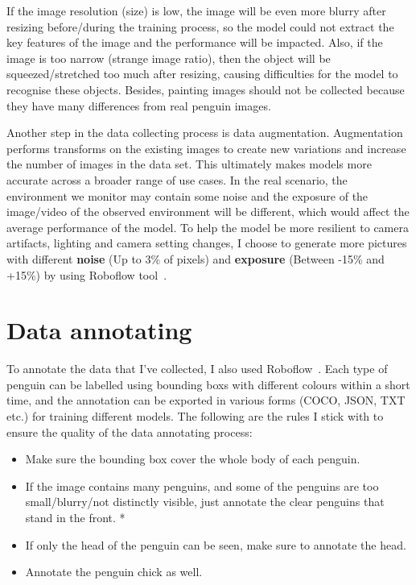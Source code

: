 \documentclass[runningheads]{llncs}
\begin{document}
If the image resolution (size) is low, the image will be even more blurry after resizing before/during the training process, so the model could not extract the key features of the image and the performance will be impacted. Also, if the image is too narrow (strange image ratio), then the object will be squeezed/stretched too much after resizing, causing difficulties for the model to recognise these objects. Besides, painting images should not be collected because they have many differences from real penguin images.

Another step in the data collecting process is data augmentation. Augmentation performs transforms on the existing images to create new variations and increase the number of images in the data set. This ultimately makes models more accurate across a broader range of use cases. 
In the real scenario, the environment we monitor may contain some noise and the exposure of the image/video of the observed environment will be different, which would affect the average performance of the model. To help the model be more resilient to camera artifacts, lighting and camera setting changes, I choose to generate more pictures with different \textbf{noise} (Up to 3\% of pixels) and \textbf{exposure} (Between -15\% and +15\%) by using Roboflow tool~\cite{ref_roboflow}.


\section{Data annotating}
To annotate the data that I've collected, I also used Roboflow~\cite{ref_roboflow}. Each type of penguin can be labelled using bounding boxs with different colours within a short time, and the annotation can be exported in various forms (COCO, JSON, TXT etc.) for training different models. The following are the rules I stick with to ensure the quality of the data annotating process:

\begin{itemize}
  \item Make sure the bounding box cover the whole body of each penguin.
  \item If the image contains many penguins, and some of the penguins are too small/blurry/not distinctly visible, just annotate the clear penguins that stand in the front. *
  \item If only the head of the penguin can be seen, make sure to annotate the head.
  \item Annotate the penguin chick as well.
\end{itemize}
\end{document}

